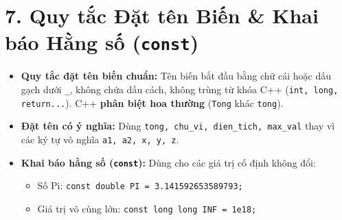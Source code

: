 \documentclass[11pt,a4paper]{article}
\begin{document}
\section*{\color{AsianDarkBlue}\normalsize 7. Quy tắc Đặt tên Biến \& Khai báo Hằng số (\texttt{const})}
\begin{itemize}
    \setlength{\itemsep}{0.5pt}
    \small
    \item \textbf{Quy tắc đặt tên biến chuẩn:} Tên biến bắt đầu bằng chữ cái hoặc dấu gạch dưới \texttt{\_}, không chứa dấu cách, không trùng từ khóa C++ (\texttt{int, long, return...}). C++ \textbf{phân biệt hoa thường} (\texttt{Tong} khác \texttt{tong}).
    \item \textbf{Đặt tên có ý nghĩa:} Dùng \texttt{tong, chu\_vi, dien\_tich, max\_val} thay vì các ký tự vô nghĩa \texttt{a1, a2, x, y, z}.
    \item \textbf{Khai báo hằng số (\texttt{const}):} Dùng cho các giá trị cố định không đổi:
    \begin{itemize}
        \item Số Pi: \texttt{const double PI = 3.141592653589793;}
        \item Giá trị vô cùng lớn: \texttt{const long long INF = 1e18;}
    \end{itemize}
\end{itemize}
\end{document}
